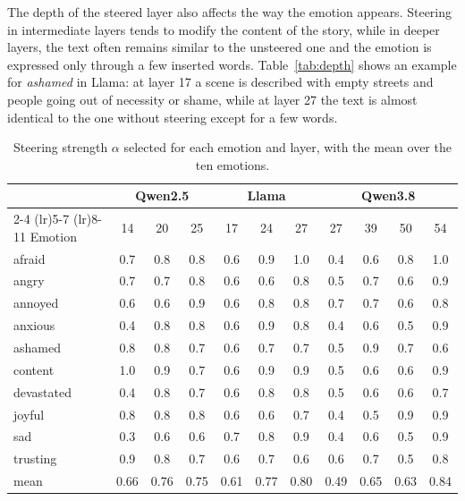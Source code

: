 \documentclass{article}
\begin{document}
The depth of the steered layer also affects the way the emotion appears. Steering in intermediate layers tends to modify the content of the story, while in deeper layers, the text often remains similar to the unsteered one and the emotion is expressed only through a few inserted words. Table~\ref{tab:depth} shows an example for \textit{ashamed} in Llama: at layer 17 a scene is described with empty streets and people going out of necessity or shame, while at layer 27 the text is almost identical to the one without steering except for a few words.

\begin{table}[h!]
  \centering
  \small
  \begin{tabular}{l ccc ccc cccc}
    \toprule
    & \multicolumn{3}{c}{Qwen2.5} & \multicolumn{3}{c}{Llama} & \multicolumn{4}{c}{Qwen3.8} \\
    \cmidrule(lr){2-4} \cmidrule(lr){5-7} \cmidrule(lr){8-11}
    Emotion & 14 & 20 & 25 & 17 & 24 & 27 & 27 & 39 & 50 & 54 \\
    \midrule
    afraid     & 0.7 & 0.8 & 0.8 & 0.6 & 0.9 & 1.0 & 0.4 & 0.6 & 0.8 & 1.0 \\
    angry      & 0.7 & 0.7 & 0.8 & 0.6 & 0.6 & 0.8 & 0.5 & 0.7 & 0.6 & 0.9 \\
    annoyed    & 0.6 & 0.6 & 0.9 & 0.6 & 0.8 & 0.8 & 0.7 & 0.7 & 0.6 & 0.8 \\
    anxious    & 0.4 & 0.8 & 0.8 & 0.6 & 0.9 & 0.8 & 0.4 & 0.6 & 0.5 & 0.9 \\
    ashamed    & 0.8 & 0.8 & 0.7 & 0.6 & 0.7 & 0.7 & 0.5 & 0.9 & 0.7 & 0.6 \\
    content    & 1.0 & 0.9 & 0.7 & 0.6 & 0.9 & 0.9 & 0.5 & 0.6 & 0.6 & 0.9 \\
    devastated & 0.4 & 0.8 & 0.7 & 0.6 & 0.8 & 0.8 & 0.5 & 0.6 & 0.6 & 0.7 \\
    joyful     & 0.8 & 0.8 & 0.8 & 0.6 & 0.6 & 0.7 & 0.4 & 0.5 & 0.9 & 0.9 \\
    sad        & 0.3 & 0.6 & 0.6 & 0.7 & 0.8 & 0.9 & 0.4 & 0.6 & 0.5 & 0.9 \\
    trusting   & 0.9 & 0.8 & 0.7 & 0.6 & 0.7 & 0.6 & 0.6 & 0.7 & 0.5 & 0.8 \\
    \midrule
    mean       & 0.66 & 0.76 & 0.75 & 0.61 & 0.77 & 0.80 & 0.49 & 0.65 & 0.63 & 0.84 \\
    \bottomrule
  \end{tabular}
  \caption{Steering strength $\alpha$ selected for each emotion and layer, with the mean over the ten emotions.}
  \label{tab:alphas}
\end{table}
\end{document}
